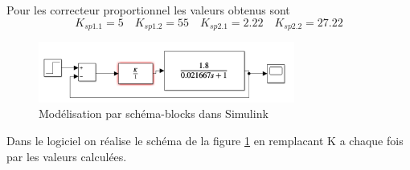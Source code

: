 \documentclass[12pt, a4paper]{report}
\begin{document}
Pour les correcteur proportionnel les valeurs obtenus sont 
$$
    K_{sp1.1} = 5 \quad K_{sp1.2} = 55 \quad K_{sp2.1} = 2.22 \quad K_{sp2.2} = 27.22
$$

\begin{figure}[h]
    \centering
    \includegraphics[width=0.75\textwidth]{schemasimulink1.png}
    \caption{Modélisation par schéma-blocks dans Simulink}
    \label{fig:schemablocksim1}
\end{figure}

Dans le logiciel on réalise le schéma de la figure \ref{fig:schemablocksim1} en remplacant K
a chaque fois par les valeurs calculées.
\end{document}

